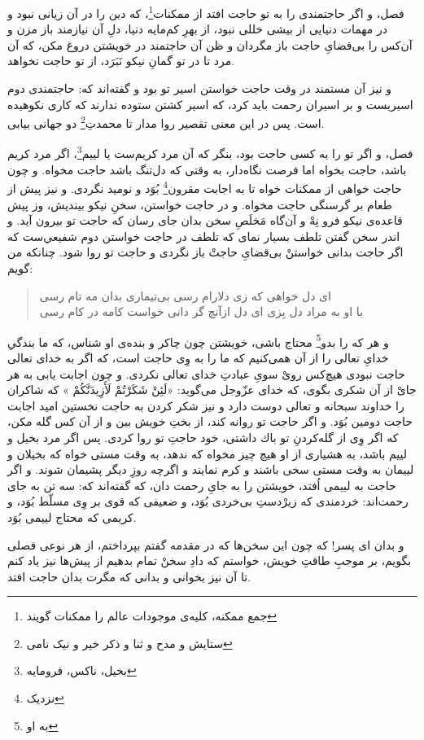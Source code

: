 فصل، و اگر حاجتمندى را به تو حاجت افتد از ممكنات\footnote{جمع ممکنه، کلیه‌ی موجودات عالم را ممکنات گویند}، كه دين را در آن زيانى نبود و در مهمات دنيایى از بيشى خللى نبود، از بهرِ كم‌مايه دنيا، دلِ آن نيازمند باز مزن و آن‌كس را بى‌قضاىِ حاجت باز مگردان و ظن آن حاجتمند در خويشتن دروغ مكن، كه آن مرد تا در تو گمانِ نيكو نَبَرَد، از تو حاجت نخواهد.

و نيز آن مستمند در وقت حاجت خواستن اسير تو بود و گفته‌اند كه: حاجتمندى دوم اسيريست و بر اسيران رحمت بايد كرد، كه اسير كشتن ستوده ندارند كه كارى نكوهيده است. پس در اين معنى تقصير روا مدار تا محمدتِ\footnote{ستایش و مدح و ثنا و ذکر خیر و نیک نامی} دو جهانى بيابى.

فصل، و اگر تو را به كسى حاجت بود، بنگر كه آن مرد كريم‌ست يا لييم\footnote{بخیل، ناکس، فرومایه}، اگر مرد كريم باشد، حاجت بخواه اما فرصت نگاه‌دار، به وقتى كه دل‌تنگ باشد حاجت مخواه. و چون حاجت خواهى از ممكنات خواه تا به اجابت مقرون\footnote{نزدیک} بُوَد و نوميد نگردى. و نيز پيش از طعام بر گرسنگى حاجت مخواه. و در حاجت خواستن، سخنِ نيكو بينديش، وز پيش قاعده‌ی نيكو فرو نِهْ و آن‌گاه مَخلَصِ سخن بدان جاى رسان كه حاجت تو بيرون آيد. و اندر سخن گفتن تلطف بسيار نماى كه تلطف در حاجت خواستن دوم شفيعي‌ست كه اگر حاجت بدانى خواستنْ بى‌قضاىِ حاجتْ باز نگردى و حاجت تو روا شود. چنانكه من گويم:

\begin{quote}
اى دل خواهى كه زى دلارام رسى \quad \quad بى‌تيمارى بدان مه تام رسى \\
با او به مراد دل بِزى اى دل ازآنچ \quad \quad گر دانى خواست كامه در كام رسى
\end{quote}
و هر كه را بدو\footnote{به او} محتاج باشی، خويشتن چون چاكر و بنده‌ی او شناس، كه ما بندگیِ خداىِ تعالى را از آن همى‌كنيم كه ما را به وِى حاجت است، كه اگر به خداى تعالى حاجت نبودى هيچ‌كس روىْ سوىِ عبادتِ خداى تعالى نكردى. و چون اجابت يابى به هر جاىْ از آن شكرى بگوى، كه خداى عزّوجل مى‌گويد: «لَئِنْ شَكَرْتُمْ لَأَزِيدَنَّكُمْ » كه شاكران را خداوند سبحانه و تعالى دوست دارد و نيز شكر كردن به حاجت نخستين اميد اجابت حاجت دومين بُوَد. و اگر حاجت تو روانه كند، از بختِ خويش بين و از آن كس گله مكن، كه اگر وِى از گله‌كردنِ تو باك داشتى، خود حاجتِ تو روا كردى. پس اگر مرد بخيل و لييم باشد، به هشيارى از او هيچ چيز مخواه كه ندهد، به وقت مستى خواه كه بخيلان و لييمان به وقت مستى سخى باشند و كرم نمايند و اگرچه روزِ ديگر پشيمان شوند. و اگر حاجت به لييمى اُفتد، خويشتن را به جاىِ رحمت دان، كه گفته‌اند كه: سه تن به جاى رحمت‌اند: خردمندى كه زيرْدستِ بى‌خردى بُوَد، و ضعيفى كه قوى بر وِى مسلّط بُوَد، و كريمى كه محتاج لييمى بُوَد.

و بدان اى پسر! كه چون اين سخن‌ها كه در مقدمه گفتم بپرداختم، از هر نوعى فصلى بگويم، بر موجبِ طاقتِ خويش، خواستم كه دادِ سخنْ تمام بدهيم از پيش‌ها نيز ياد كنم تا آن نيز بخوانى و بدانى كه مگرت بدان حاجت افتد.

